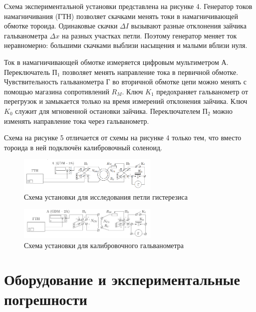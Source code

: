 \documentclass[14pt, a4paper,reqno]{article}
\begin{document}
    Схема экспериментальной установки представлена на рисунке 4. Генератор токов намагничивания (ГТН) позволяет
    скачками менять токи в намагничивающей обмотке тороида. Одинаковые скачки $\Delta I$ вызывают разные отклонения
    зайчика гальванометра $\Delta x$ на разных участках петли. Поэтому генератор меняет ток неравномерно: большими
    скачками выблизи насыщения и малыми вблизи нуля.

    Ток в намагничивающей обмотке измеряется цифровым мультиметром А. Переключатель $П_1$ позволяет менять направление
    тока в первичной обмотке. Чувствительность гальванометра Г во вторичной обмотке цепи можно менять с помощью магазина
    сопротивлений $R_M$. Ключ $K_1$ предохраняет гальванометр от перегрузок и замыкается только на время измерений отклонения
    зайчика. Ключ $K_0$ служит для мгновенной остановки зайчика. Переключателем $П_2$ можно изменять направление тока
    через гальванометр.

    Схема на рисунке 5 отличается от схемы на рисунке 4 только тем, что вместо тороида в ней подключён калибровочный соленоид.

    \begin{figure}[h]
        \begin{center}
            \includegraphics[width = 0.6\textwidth]{images/picture_4.png}
        \end{center}
    \caption{Схема установки для исследования петли гистерезиса}
    \end{figure}

    \begin{figure}[h]
        \begin{center}
            \includegraphics[width = 0.6\textwidth]{images/picture_5.png}
        \end{center}
    \caption{Схема установки для калибровочного гальванометра}
    \end{figure}

\section{Оборудование и экспериментальные погрешности}
\end{document}
